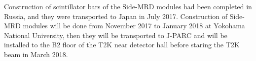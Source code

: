 Construction of scintillator bars of the Side-MRD modules had been completed in Russia, and they were transported to Japan in July 2017. 
Construction of Side-MRD modules will be done from November 2017 to January 2018 at Yokohama National University, then they will be transported to J-PARC and will be installed to the B2 floor of the T2K near detector hall before staring the T2K beam in March 2018.

